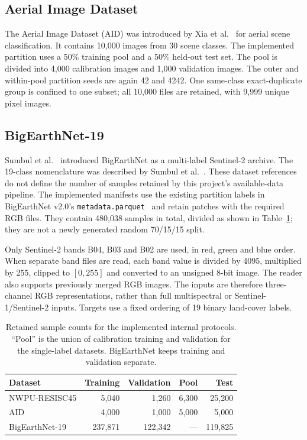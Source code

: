 \subsection{Aerial Image Dataset}

The Aerial Image Dataset (AID) was introduced by Xia
et al.~\cite{xia2017aid} for aerial scene classification. It contains 10,000
images from 30 scene classes. The implemented partition uses a 50\% training
pool and a 50\% held-out test set. The pool is divided into 4,000 calibration
images and 1,000 validation images. The outer and within-pool partition seeds
are again 42 and 4242. One same-class exact-duplicate group is confined to
one subset; all 10,000 files are retained, with 9,999 unique pixel images.

\subsection{BigEarthNet-19}

Sumbul et al.~\cite{sumbul2019bigearthnet} introduced BigEarthNet as a
multi-label Sentinel-2 archive. The 19-class nomenclature was described by
Sumbul et al.~\cite{sumbul2021bigearthnetmm}. These dataset references do
not define the number of samples retained by this project's available-data
pipeline. The implemented manifests use the existing partition labels in
BigEarthNet v2.0's \texttt{metadata.parquet}~\cite{clasen2024bigearthnetv2}
and retain patches with the required RGB files. They contain 480,038
samples in total, divided as shown in Table~\ref{tab:partitions}; they are not
a newly generated random 70/15/15 split.

Only Sentinel-2 bands B04, B03 and B02 are used, in red, green and blue order.
When separate band files are read, each band value is divided by 4095,
multiplied by 255, clipped to $[0,255]$ and converted to an unsigned 8-bit
image. The reader also supports previously merged RGB images. The inputs
are therefore three-channel RGB representations, rather than full
multispectral or Sentinel-1/Sentinel-2 inputs. Targets use a fixed ordering
of 19 binary land-cover labels.

\begin{table}[tbp]
 \centering
 \caption{Retained sample counts for the implemented internal protocols.
 ``Pool'' is the union of calibration training and validation for the
 single-label datasets. BigEarthNet keeps training and validation separate.}
 \label{tab:partitions}
 \small
 \setlength{\tabcolsep}{4pt}
 \begin{tabular}{lrrrr}
  \toprule
  Dataset & Training & Validation & Pool & Test\\
  \midrule
  NWPU-RESISC45 & 5,040 & 1,260 & 6,300 & 25,200\\
  AID & 4,000 & 1,000 & 5,000 & 5,000\\
  BigEarthNet-19 & 237,871 & 122,342 & --- & 119,825\\
  \bottomrule
 \end{tabular}
\end{table}


